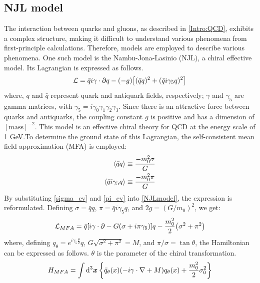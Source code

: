     \subsection{NJL model}
    \label{NJL model}      
        The interaction between quarks and gluons, as described in \ref{Intro:QCD}, exhibits a complex structure, making it difficult to understand various phenomena from first-principle calculations. Therefore, models are employed to describe various phenomena. One such model is the Nambu-Jona-Lasinio (NJL), a chiral effective model. Its Lagrangian is expressed as follows.
        \begin{eqnarray}
            \label{NJLmodel}
            \mathcal{L}=\bar{q}i\gamma \cdot \partial q -(-g)\qty[(\bar{q}q)^2+(\bar{q}i\gamma_5q)^2]
        \end{eqnarray}  
        where, $q$ and $\bar{q}$ represent quark and antiquark fields, respectively; $\gamma$ and $\gamma_5$ are gamma matrices, with $\gamma_5 = i \gamma_0 \gamma_1 \gamma_2 \gamma_3$. Since there is an attractive force between quarks and antiquarks, the coupling constant $g$ is positive and has a dimension of $[\text{mass}]^{-2}$.  
        This model is an effective chiral theory for QCD at the energy scale of 1 GeV.\@ To determine the ground state of this Lagrangian, the self-consistent mean field approximation (MFA) is employed: 
        \begin{eqnarray}
            \label{sigma_ev}
            \ev{\bar{q}q}\equiv \frac{-m_0^2 \sigma}{G}\\
            \label{pi_ev}
            \ev{\bar{q}i\gamma_5q}\equiv \frac{-m_0^2 \pi}{G}
        \end{eqnarray}
        By substituting \eqref{sigma_ev} and \eqref{pi_ev} into \eqref{NJLmodel}, the expression is reformulated. Defining $\sigma = \bar{q}q$, $\pi = \bar{q} i \gamma_5 q$, and $2g = (G/m_0)^2$, we get:  
        \begin{eqnarray}
            \label{heikinbago}
            \mathcal{L}_{MFA} = \bar{q}\qty[i \gamma \cdot \partial - G(\sigma + i \pi \gamma_5)]q-\frac{m_0^2}{2}\qty(\sigma^2+\pi^2)
        \end{eqnarray}
        where, defining $q_\theta = e^{i \gamma_5 \frac{\theta}{2}} q$, $G \sqrt{\sigma^2 + \pi^2} = M$, and $\pi / \sigma = \tan{\theta}$, the Hamiltonian can be expressed as follows. $\theta$ is the parameter of the chiral transformation.  
        \begin{eqnarray}
            \label{ham}
            H_{MFA}=\int \dd[3]{\bm{x}}\qty{\bar{q}_\theta (x)(-i\gamma \cdot \nabla+M)q_{\theta}(x)+\frac{m_0^2}{2}\sigma_0^2}
        \end{eqnarray}
